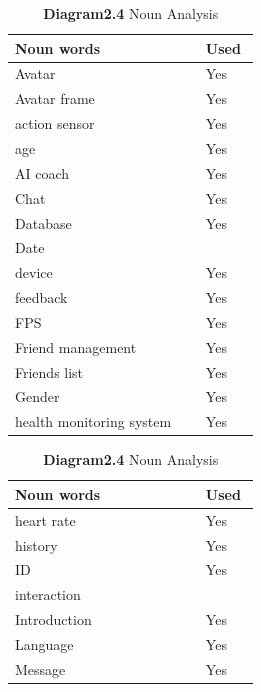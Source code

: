 \documentclass[a4paper]{article}
\begin{document}
	\begin{table}[h!]
		\caption*{\textbf{Diagram2.4} Noun Analysis}
		\noindent\begin{minipage}{\textwidth}
			\begin{minipage}[t]{0.48\textwidth}
		 	\centering
			\makeatletter{}\makeatother
			  	\begin{tabular}{|p{0.7\linewidth}|p{0.2\linewidth}|} 
		   			\hline
					\textbf{Noun words} & \textbf{Used} \\
					\hline
					Avatar & Yes\\
					\hline
					Avatar frame & Yes\\
					\hline
					action sensor & Yes\\
					\hline
					age & Yes\\
					\hline
					AI coach & Yes\\
					\hline
					Chat & Yes\\
					\hline
					Database & Yes\\
					\hline
					Date & \\
					\hline
					device & Yes\\
					\hline
					feedback & Yes\\
					\hline
					FPS & Yes\\
					\hline
					Friend management & Yes\\
					\hline
					Friends list & Yes\\
					\hline
					Gender & Yes\\
					\hline
					health monitoring system & Yes\\
					\hline
		   		\end{tabular}
		 	\end{minipage}
		 	\begin{minipage}[t]{0.48\textwidth}
		  	\centering
			   	\makeatletter{}\makeatother
				\begin{tabular}{|p{0.7\linewidth}|p{0.2\linewidth}|}        
					\hline
					\textbf{Noun words} & \textbf{Used} \\
					\hline
					heart rate& Yes\\
					\hline
					history & Yes\\
					\hline
					ID & Yes\\
					\hline
					interaction & \\
					\hline
					Introduction & Yes\\
					\hline
					Language & Yes\\
					\hline
					Message & Yes\\

\end{tabular}
\end{minipage}
\end{minipage}
\end{table}
\end{document}
